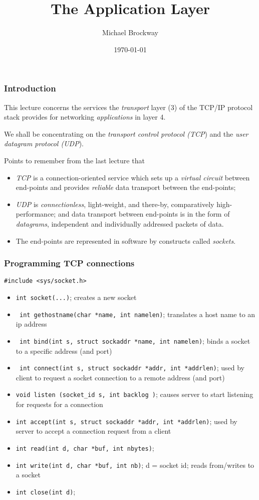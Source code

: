\documentclass[10pt, hyperref={pdfpagelabels=false}]{beamer}
\title{The Application Layer}
\author{Michael Brockway}
\date{\today}
\begin{document}
\begin{frame}
\titlepage
\end{frame}

\begin{frame}
\frametitle{Introduction}
This lecture concerns the services the \emph{transport} layer (3) of the TCP/IP protocol stack provides for networking \emph{applications} in layer 4.

We shall be concentrating on the \emph{transport control protocol (\color{blue}TCP}) and the \emph{user datagram protocol (\color{blue}UDP}).

Points to remember from the last lecture that
\begin{itemize}
\item \emph{TCP} is a connection-oriented service which sets up a \emph{virtual circuit} between end-points and provides \emph{reliable} data transport between the end-points;
\item \emph{UDP} is \emph{connectionless}, light-weight, and there-by, comparatively high-performance; and data transport between end-points is in the form of \emph{datagrams}, independent and individually addressed packets of data.
\item The end-points are represented in software by constructs called \emph{sockets}.
\end{itemize}
\end{frame}

\begin{frame}
\frametitle{Programming TCP connections}
\texttt{\#include <sys/socket.h>}
\begin{itemize}
\item \texttt{\color{blue}int socket(...)}; creates a new socket
\item \texttt{\color{blue} int gethostname(char *name, int namelen)}; translates a host name to an ip address
\item \texttt{\color{blue} int bind(int s, struct sockaddr *name, int namelen)}; binds a socket to a specific address (and port)
\item \texttt{\color{blue} int connect(int s, struct sockaddr *addr, int *addrlen)}; used by client to request a socket connection to a remote address (and port)
\item \texttt{\color{blue}void listen (socket\_id s, int backlog )}; causes server to start listening for requests for a connection
\item \texttt{\color{blue}int accept(int s, struct sockaddr *addr, int *addrlen)}; used by server to accept a connection request from a client
\item \texttt{\color{blue}int read(int d, char *buf, int nbytes)};
\item \texttt{\color{blue}int write(int d, char *buf, int nb)}; d = socket id; reads from/writes to a socket
\item \texttt{\color{blue}int close(int d)};
\end{itemize}
\end{frame}
\end{document}
